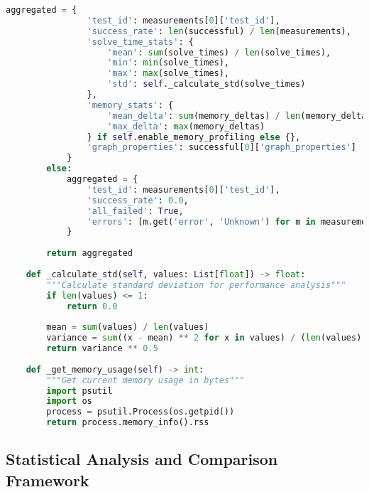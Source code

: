 \begin{lstlisting}[language=Python, caption=Performance Measurement Infrastructure]
            aggregated = {
                'test_id': measurements[0]['test_id'],
                'success_rate': len(successful) / len(measurements),
                'solve_time_stats': {
                    'mean': sum(solve_times) / len(solve_times),
                    'min': min(solve_times),
                    'max': max(solve_times),
                    'std': self._calculate_std(solve_times)
                },
                'memory_stats': {
                    'mean_delta': sum(memory_deltas) / len(memory_deltas),
                    'max_delta': max(memory_deltas)
                } if self.enable_memory_profiling else {},
                'graph_properties': successful[0]['graph_properties']
            }
        else:
            aggregated = {
                'test_id': measurements[0]['test_id'],
                'success_rate': 0.0,
                'all_failed': True,
                'errors': [m.get('error', 'Unknown') for m in measurements]
            }
        
        return aggregated
    
    def _calculate_std(self, values: List[float]) -> float:
        """Calculate standard deviation for performance analysis"""
        if len(values) <= 1:
            return 0.0
        
        mean = sum(values) / len(values)
        variance = sum((x - mean) ** 2 for x in values) / (len(values) - 1)
        return variance ** 0.5
    
    def _get_memory_usage(self) -> int:
        """Get current memory usage in bytes"""
        import psutil
        import os
        process = psutil.Process(os.getpid())
        return process.memory_info().rss
\end{lstlisting}

\subsection{Statistical Analysis and Comparison Framework}
\label{appendix:statistical-analysis}

